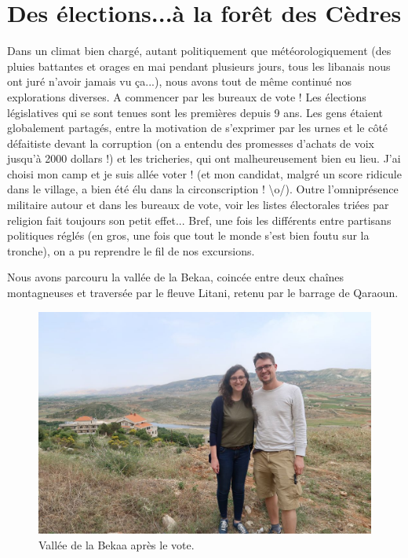 \hypertarget{des-uxe9lections...uxe0-la-foruxeat-des-cuxe8dres}{%
\section{Des élections...à la forêt des
Cèdres}\label{des-uxe9lections...uxe0-la-foruxeat-des-cuxe8dres}}

\hypertarget{mapid}{}

Dans un climat bien chargé, autant politiquement que météorologiquement
(des pluies battantes et orages en mai pendant plusieurs jours, tous les
libanais nous ont juré n'avoir jamais vu ça...), nous avons tout de même
continué nos explorations diverses. A commencer par les bureaux de vote
! Les élections législatives qui se sont tenues sont les premières
depuis 9 ans. Les gens étaient globalement partagés, entre la motivation
de s'exprimer par les urnes et le côté défaitiste devant la corruption
(on a entendu des promesses d'achats de voix jusqu'à 2000 dollars !) et
les tricheries, qui ont malheureusement bien eu lieu. J'ai choisi mon
camp et je suis allée voter ! (et mon candidat, malgré un score ridicule
dans le village, a bien été élu dans la circonscription !
\textbackslash{}o/). Outre l'omniprésence militaire autour et dans les
bureaux de vote, voir les listes électorales triées par religion fait
toujours son petit effet... Bref, une fois les différents entre
partisans politiques réglés (en gros, une fois que tout le monde s'est
bien foutu sur la tronche), on a pu reprendre le fil de nos excursions.

Nous avons parcouru la vallée de la Bekaa, coincée entre deux chaînes
montagneuses et traversée par le fleuve Litani, retenu par le barrage de
Qaraoun.

\begin{figure}
\centering
\includegraphics{images/20180517_bekaa.jpg}
\caption{Vallée de la Bekaa après le vote.}
\end{figure}

